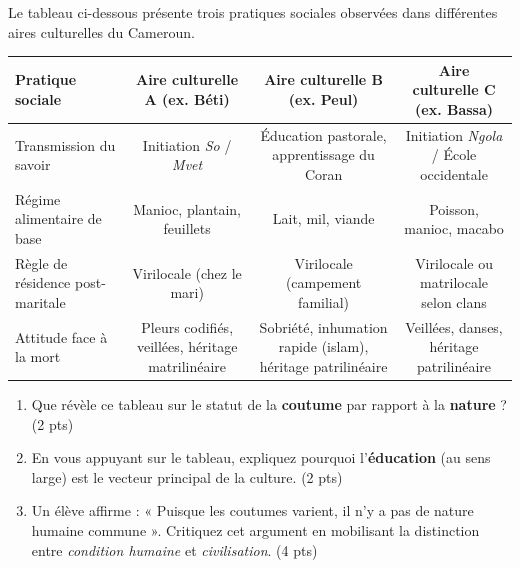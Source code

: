 \documentclass[11pt]{article}
\begin{document}
\begin{exercice}
Le tableau ci-dessous présente trois pratiques sociales observées dans différentes aires culturelles du Cameroun.
\begin{center}
\begin{tabularx}{\linewidth}{|X|c|c|c|}
\hline
\textbf{Pratique sociale} & \textbf{Aire culturelle A (ex. Béti)} & \textbf{Aire culturelle B (ex. Peul)} & \textbf{Aire culturelle C (ex. Bassa)} \\ \hline
Transmission du savoir & Initiation \textit{So} / \textit{Mvet} & Éducation pastorale, apprentissage du Coran & Initiation \textit{Ngola} / École occidentale \\ \hline
Régime alimentaire de base & Manioc, plantain, feuillets & Lait, mil, viande & Poisson, manioc, macabo \\ \hline
Règle de résidence post-maritale & Virilocale (chez le mari) & Virilocale (campement familial) & Virilocale ou matrilocale selon clans \\ \hline
Attitude face à la mort & Pleurs codifiés, veillées, héritage matrilinéaire & Sobriété, inhumation rapide (islam), héritage patrilinéaire & Veillées, danses, héritage patrilinéaire \\ \hline
\end{tabularx}
\end{center}
\begin{enumerate}
    \item Que révèle ce tableau sur le statut de la \textbf{coutume} par rapport à la \textbf{nature} ? (2 pts)
    \item En vous appuyant sur le tableau, expliquez pourquoi l'\textbf{éducation} (au sens large) est le vecteur principal de la culture. (2 pts)
    \item Un élève affirme : « Puisque les coutumes varient, il n'y a pas de nature humaine commune ». Critiquez cet argument en mobilisant la distinction entre \textit{condition humaine} et \textit{civilisation}. (4 pts)
\end{enumerate}
\end{exercice}
\end{document}
